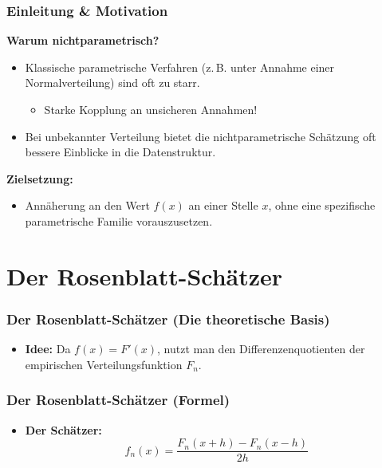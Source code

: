 \documentclass{beamer}
\newif\ifpauseswitch
\begin{document}
\begin{frame}
	\frametitle{Einleitung \& Motivation}
	
	\textbf{Warum nichtparametrisch? \cite{BüningTrenkler+1994}}
	\begin{itemize}
		\item Klassische parametrische Verfahren (z.\,B. unter Annahme einer Normalverteilung) sind oft zu starr.
		\begin{itemize}
			\item Starke Kopplung an unsicheren Annahmen!
		\end{itemize}
		\item Bei unbekannter Verteilung bietet die nichtparametrische Schätzung oft bessere Einblicke in die Datenstruktur.
	\end{itemize}
	
	\ifpauseswitch
		\pause
	\fi
	
	\textbf{Zielsetzung:}
	\begin{itemize}
		\item Annäherung an den Wert $f(x)$ an einer Stelle $x$, ohne eine spezifische parametrische Familie vorauszusetzen.
	\end{itemize}
\end{frame}

\section{Der Rosenblatt-Schätzer}

\begin{frame}
	\frametitle{Der Rosenblatt-Schätzer (Die theoretische Basis)}
	
	\begin{itemize}
		\item \textbf{Idee:} Da $f(x) = F'(x)$, nutzt man den Differenzenquotienten der empirischen Verteilungsfunktion $F_n$.
	\end{itemize}
\end{frame}

\begin{frame}
	\frametitle{Der Rosenblatt-Schätzer (Formel)}
	
	\begin{itemize}
		\item \textbf{Der Schätzer:}
		\begin{equation}
			f_n(x) = \frac{F_n(x+h) - F_n(x-h)}{2h}
		\end{equation}
	\end{itemize}
\end{frame}
\end{document}
